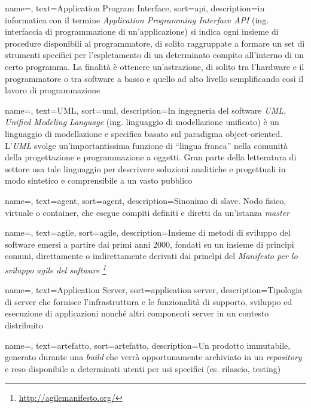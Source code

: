 {
    name=,
    text=Application Program Interface,
    sort=api,
    description={in informatica con il termine \emph{Application Programming Interface API} (ing. interfaccia di programmazione di un'applicazione) si indica ogni insieme di procedure disponibili al programmatore, di solito raggruppate a formare un set di strumenti specifici per l'espletamento di un determinato compito all'interno di un certo programma. La finalità è ottenere un'astrazione, di solito tra l'hardware e il programmatore o tra software a basso e quello ad alto livello semplificando così il lavoro di programmazione}
}

{
    name=,
    text=UML,
    sort=uml,
    description={In ingegneria del software \emph{UML, Unified Modeling Language} (ing. linguaggio di modellazione unificato) è un linguaggio di modellazione e specifica basato sul paradigma object-oriented. L'\emph{UML} svolge un'importantissima funzione di ``lingua franca'' nella comunità della progettazione e programmazione a oggetti. Gran parte della letteratura di settore usa tale linguaggio per descrivere soluzioni analitiche e progettuali in modo sintetico e comprensibile a un vasto pubblico}
}

{
    name=,
    text=agent,
    sort=agent,
    description={Sinonimo di slave. Nodo fisico, virtuale o container, che esegue compiti definiti e diretti da un'istanza \textit{master}}
}

{
    name=,
    text=agile,
    sort=agile,
    description={Insieme di metodi di sviluppo del software emersi a partire dai primi anni 2000, fondati su un insieme di principi comuni, direttamente o indirettamente derivati dai princìpi del \textit{Manifesto per lo sviluppo agile del software  \footnote{\url{http://agilemanifesto.org/}}}}
}

{
    name=,
    text=Application Server,
    sort=application server,
    description={Tipologia di server che fornisce l'infrastruttura e le funzionalità di supporto, sviluppo ed esecuzione di applicazioni nonché altri componenti server in un contesto distribuito}
}

{
    name=,
    text=artefatto,
    sort=artefatto,
    description={Un prodotto immutabile, generato durante una \textit{build} che verrà opportunamente archiviato in un \textit{repository} e reso disponibile a determinati utenti per usi specifici (es. rilascio, testing)}
}

